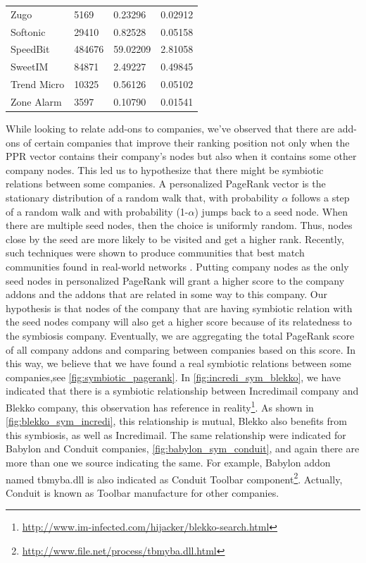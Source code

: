 \documentclass[11pt,oneside]{book}
\begin{document}
{{{{\begin{table}[h]
\begin{tabular}{@{}llll@{}}
Zugo           & 5169     & 0.23296              & 0.02912                \\
Softonic       & 29410    & 0.82528              & 0.05158                \\
SpeedBit       & 484676   & 59.02209             & 2.81058                \\
SweetIM        & 84871    & 2.49227              & 0.49845                \\
Trend Micro    & 10325    & 0.56126              & 0.05102                \\
Zone Alarm     & 3597     & 0.10790              & 0.01541                \\ \bottomrule
\end{tabular}
\end{table}  

While looking to relate add-ons to companies, we've observed that there are add-ons of certain companies that improve their ranking position not only when the PPR vector contains their company's nodes but also when it contains some other company nodes. This led us to hypothesize that there might be symbiotic relations between some companies.
A personalized PageRank vector is the stationary distribution of a random walk that, with probability $\alpha$ follows a step of a random walk and with probability (1-$\alpha$) jumps back to a seed node. When there are multiple seed nodes, then the choice is uniformly random. Thus, nodes close by the seed are more likely to be visited and get a higher rank. Recently, such techniques were shown to produce communities that best match communities found in real-world networks \citep{abrahao2012separability}. Putting company nodes as the only seed nodes in personalized PageRank will grant a higher score to the company addons and the addons that are related in some way to this company. Our hypothesis is that nodes of the company that are having symbiotic relation with the seed nodes company will also get a higher score because of its relatedness to the symbiosis company.
Eventually, we are aggregating the total PageRank score of all company addons and comparing between companies based on this score.
In this way, we believe that we have found a real symbiotic relations between some companies,see \autoref{fig:symbiotic_pagerank}.
In \autoref{fig:incredi_sym_blekko}, we have indicated that there is a symbiotic relationship between Incredimail company and Blekko company, this observation has reference in reality\footnote{\url{http://www.im-infected.com/hijacker/blekko-search.html}}. As shown in \autoref{fig:blekko_sym_incredi}, this relationship is mutual, Blekko also benefits from this symbiosis, as well as Incredimail. The same relationship were indicated for Babylon and Conduit companies, \autoref{fig:babylon_sym_conduit}, and again there are more than one we source indicating the same. For example, Babylon addon named tbmyba.dll is also indicated as Conduit Toolbar component\footnote{\url{http://www.file.net/process/tbmyba.dll.html}}. Actually, Conduit is known as Toolbar manufacture for other companies.

}}}}
\end{document}
